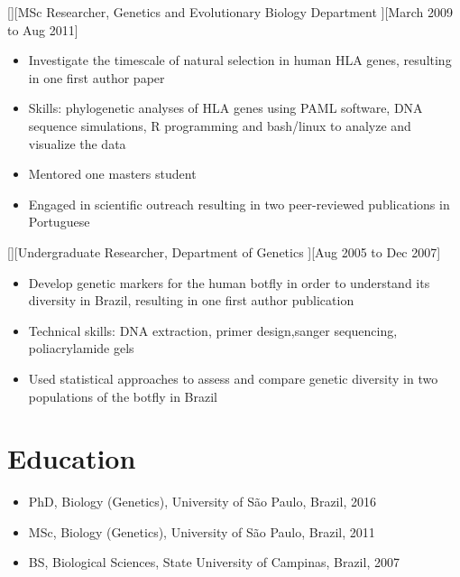 \documentclass{article}
\begin{document}
[][MSc Researcher, Genetics and Evolutionary Biology Department ][March 2009 to Aug 2011]
\begin{itemize}
    \item Investigate the timescale of natural selection in human HLA genes, resulting in one first author paper
    \item Skills: phylogenetic analyses of HLA genes using PAML software, DNA sequence simulations, R programming and bash/linux to analyze and visualize the data
    \item Mentored one masters student
    \item Engaged in scientific outreach resulting in two peer-reviewed publications in Portuguese
\end{itemize}

[][Undergraduate Researcher, Department of Genetics ][Aug 2005 to Dec 2007]
\begin{itemize}
\item Develop genetic markers for the human botfly in order to understand its diversity in Brazil, resulting in one first author publication
\item Technical skills: DNA extraction, primer design,sanger sequencing, poliacrylamide gels
\item Used statistical approaches to assess and compare genetic diversity in two populations of the botfly in Brazil
\end{itemize}
 
 
\section{Education}

\begin{itemize}
\item PhD, Biology (Genetics), University of São Paulo, Brazil, 2016
\item MSc, Biology (Genetics), University of São Paulo, Brazil, 2011
\item BS, Biological Sciences, State University of Campinas, Brazil, 2007
\end{itemize}
 
\end{document}
